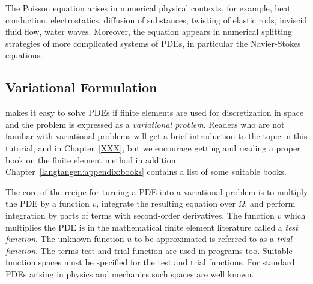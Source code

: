 The Poisson equation  arises in numerical physical
contexts, for example, heat conduction, electrostatics,
diffusion of substances, twisting of
elastic rods, inviscid fluid flow, water waves. Moreover, the equation
appears in numerical splitting strategies of more complicated systems
of PDEs, in particular the Navier-Stokes equations. 


\subsection{Variational Formulation}
\label{langtangen:poisson1:varform}

\fenics{} makes it easy to solve PDEs if finite elements are used for
discretization in space and the problem is expressed as a
\emph{variational problem}. Readers who are not familiar with
variational problems will get a brief introduction
to the topic in this tutorial, and in Chapter~\ref{XXX},
but we encourage getting and reading
a proper book on the finite element method in addition.
Chapter~\ref{langtangen:appendix:books} contains a list of some suitable
books.

The core of the recipe for turning a PDE into a variational problem
is to multiply the PDE by a function $v$, integrate the resulting
equation over $\Omega$, and perform integration by parts of terms with
second-order derivatives. The function $v$ which multiplies the PDE
is in the mathematical finite element literature 
called a \emph{test function}. The unknown function $u$ to be approximated
is referred to
as a \emph{trial function}. The terms test and trial function are used
in \fenics{} programs too.
Suitable
function spaces must be specified for the test and trial functions.
For standard PDEs arising in physics and mechanics such spaces are
well known.

